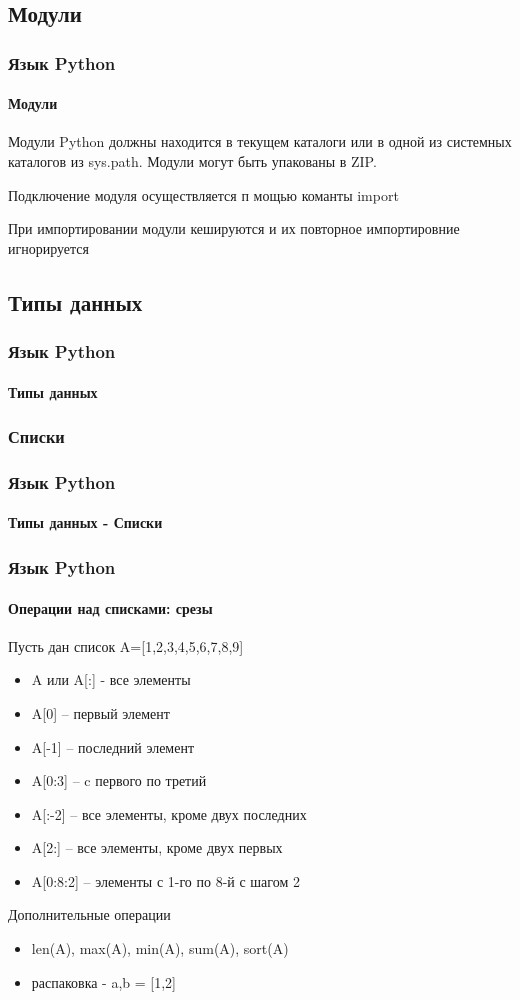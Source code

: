 \documentclass{beamer}
\begin{document}
\subsection{Модули}
\begin{frame}
\frametitle{Язык Python}
\framesubtitle{Модули}
Модули Python должны находится в текущем каталоги или в одной из системных каталогов из sys.path. Модули могут быть упакованы в
ZIP.

Подключение модуля осуществляется п мощью команты import

При импортировании модули кешируются и их повторное импортировние игнорируется
\end{frame}

\subsection{Типы данных}
\begin{frame}
\frametitle{Язык Python}
\framesubtitle{Типы данных}

\end{frame}


\subsubsection{Списки}
\begin{frame}
\frametitle{Язык Python}
\framesubtitle{Типы данных - Списки}

\end{frame}

\begin{frame}
\frametitle{Язык Python}
\framesubtitle{Операции над списками: срезы}
Пусть дан список  A=[1,2,3,4,5,6,7,8,9]
\begin{itemize}
	\item<1> A или A[:] - все элементы
	\item<1> A[0] – первый элемент
	\item<1> A[-1] – последний элемент
	\item<1> A[0:3] – c первого по третий
	\item<1> A[:-2] – все элементы, кроме двух последних
	\item<1> A[2:] – все элементы, кроме двух первых
	\item<1> A[0:8:2] – элементы с 1-го по 8-й с шагом 2
\end{itemize}

Дополнительные операции
\begin{itemize}
	\item<1> len(A), max(A), min(A), sum(A), sort(A)
	\item<1> распаковка - a,b = [1,2]
\end{itemize} 
\end{frame}
\end{document}

